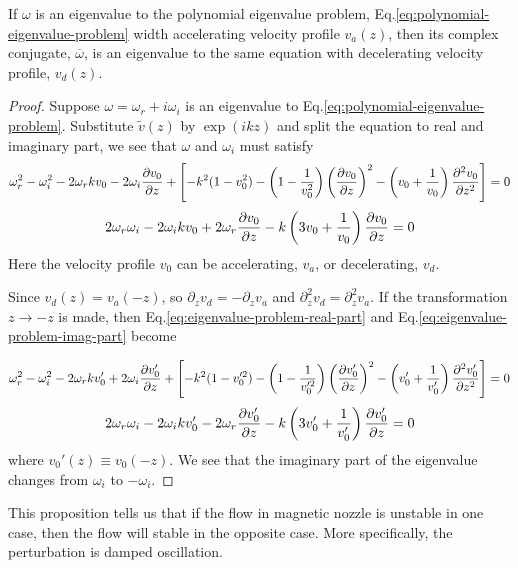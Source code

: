 \begin{proposition} \label{prop:symmetry-of-eigenvalue}
	If $\omega$ is an eigenvalue to the polynomial eigenvalue problem, Eq.\ref{eq:polynomial-eigenvalue-problem} width accelerating velocity profile $v_a(z)$, then its complex conjugate, $\overline{\omega}$, is an eigenvalue to the same equation with decelerating velocity profile, $v_d(z)$.
\end{proposition}
\begin{proof}
	Suppose $\omega=\omega_r + i\omega_i$ is an eigenvalue to Eq.\ref{eq:polynomial-eigenvalue-problem}. Substitute $\tilde{v}(z)$ by $\exp(ikz)$ and split the equation to real and imaginary part, we see that $\omega$ and $\omega_i$ must satisfy
	\begin{equation} \label{eq:eigenvalue-problem-real-part}
		\omega_r^2 - \omega_i^2 
		- 2\omega_r kv_0 - 2\omega_i\pdv{v_0}{z}
		+ \left[
		-k^2(1-v_0^2) 
		-\left(1-\frac{1}{v_0^2}\right)\left(\pdv{v_0}{z}\right)^2
		-\left(v_0+\frac{1}{v_0}\right)\pdv[2]{v_0}{z}
		\right]
		= 0
	\end{equation}
	\begin{equation} \label{eq:eigenvalue-problem-imag-part}
		2\omega_r\omega_i 
		- 2\omega_i kv_0 + 2\omega_r\pdv{v_0}{z} 
		- k\left(3v_0+\frac{1}{v_0}\right)\pdv{v_0}{z} 
		= 0
	\end{equation}
	Here the velocity profile $v_0$ can be accelerating, $v_a$, or decelerating, $v_d$.
	
	Since $v_d(z)=v_a(-z)$, so $\partial_zv_d=-\partial_zv_a$ and $\partial_z^2v_d=\partial_z^2v_a$. If the transformation $z\to -z$ is made, then Eq.\ref{eq:eigenvalue-problem-real-part} and Eq.\ref{eq:eigenvalue-problem-imag-part} become
	
	\[
		\omega_r^2 - \omega_i^2 
		- 2\omega_r kv_0' + 2\omega_i\pdv{v_0'}{z}
		+ \left[
		-k^2(1-v_0'^2) 
		-\left(1-\frac{1}{v_0'^2}\right)\left(\pdv{v_0'}{z}\right)^2
		-\left(v_0'+\frac{1}{v_0'}\right)\pdv[2]{v_0'}{z}
		\right]
		= 0
	\]
	\[
		2\omega_r\omega_i 
		- 2\omega_i kv_0' - 2\omega_r\pdv{v_0'}{z} 
		- k\left(3v_0'+\frac{1}{v_0'}\right)\pdv{v_0'}{z} 
		= 0
	\]
	where $v_0'(z) \equiv v_0(-z)$. We see that the imaginary part of the eigenvalue changes from $\omega_i$ to $-\omega_i$.
\end{proof}

\begin{remark}
	This proposition tells us that if the flow in magnetic nozzle is unstable in one case, then the flow will stable in the opposite case. More specifically, the perturbation is damped oscillation.
\end{remark}

